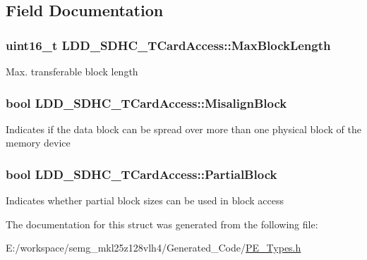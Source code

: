 \subsection{Field Documentation}
\hypertarget{struct_l_d_d___s_d_h_c___t_card_access_aeeba296e7a8dc6164c925b816416ef2e}{
\subsubsection[{Max\-Block\-Length}]{\setlength{\rightskip}{0pt plus 5cm}uint16\-\_\-t L\-D\-D\-\_\-\-S\-D\-H\-C\-\_\-\-T\-Card\-Access\-::\-Max\-Block\-Length}}\label{struct_l_d_d___s_d_h_c___t_card_access_aeeba296e7a8dc6164c925b816416ef2e}
Max. transferable block length \hypertarget{struct_l_d_d___s_d_h_c___t_card_access_aa56e65353fd03ffdbd8cc8d19537b621}{
\subsubsection[{Misalign\-Block}]{\setlength{\rightskip}{0pt plus 5cm}bool L\-D\-D\-\_\-\-S\-D\-H\-C\-\_\-\-T\-Card\-Access\-::\-Misalign\-Block}}\label{struct_l_d_d___s_d_h_c___t_card_access_aa56e65353fd03ffdbd8cc8d19537b621}
Indicates if the data block can be spread over more than one physical block of the memory device \hypertarget{struct_l_d_d___s_d_h_c___t_card_access_a9d78668915e934548a04351b20ec2d0a}{
\subsubsection[{Partial\-Block}]{\setlength{\rightskip}{0pt plus 5cm}bool L\-D\-D\-\_\-\-S\-D\-H\-C\-\_\-\-T\-Card\-Access\-::\-Partial\-Block}}\label{struct_l_d_d___s_d_h_c___t_card_access_a9d78668915e934548a04351b20ec2d0a}
Indicates whether partial block sizes can be used in block access 

The documentation for this struct was generated from the following file\-:\begin{DoxyCompactItemize}
\item 
E\-:/workspace/semg\-\_\-mkl25z128vlh4/\-Generated\-\_\-\-Code/\hyperlink{_p_e___types_8h}{P\-E\-\_\-\-Types.\-h}\end{DoxyCompactItemize}
